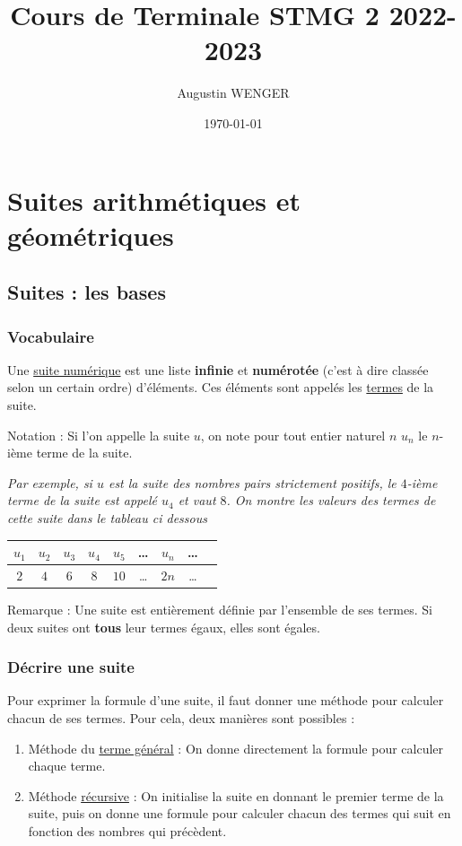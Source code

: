 \documentclass[10pt,a4paper]{book}
\author{Augustin WENGER}
\title{Cours de Terminale STMG 2 2022-2023}
\date{\today}
\begin{document}
\maketitle
\tableofcontents
\chapter{Suites arithmétiques et géométriques}

\section{Suites : les bases}


\subsection{Vocabulaire}

\begin{de}[Rappel]
    Une \underline{suite numérique} est une liste \textbf{infinie} et \textbf{numérotée} (c'est à dire classée selon un certain ordre) d'éléments.
 Ces éléments sont appelés les \underline{termes} de la suite.
\end{de}


Notation : Si l'on appelle la suite $u$, on note pour tout entier naturel $n$   $u_n$ le $n$-ième terme de la suite.


\textit{Par exemple, si $u$ est la suite des nombres pairs strictement positifs, le $4$-ième terme de la suite est appelé $u_4$ et vaut $8$. On montre les valeurs des termes de cette suite dans le tableau ci dessous }

{
\centering
    \begin{tabular}{|c|c|c|c|c|c|c|c|c|}
        \hline
         $u_1$ & $u_2$ & $u_3$ & $u_4$ & $u_5$ & \ldots & $u_n$ & \ldots\\
        \hline
         $2$ & $4$ & $6$ & $8$ & $10$ & \ldots & $2n$ & \ldots \\ 
        \hline
    \end{tabular}\par
}

Remarque : Une suite est entièrement définie par l'ensemble de ses termes. Si deux suites ont \textbf{tous} leur termes égaux, elles sont égales.

\subsection{Décrire une suite}

Pour exprimer la formule d'une suite, il faut donner une méthode pour calculer chacun de ses termes. Pour cela, deux manières sont possibles :
    \begin{enumerate}
      \item Méthode du \underline{terme général} : On donne directement la formule pour calculer chaque terme. 

      \item Méthode \underline{récursive} : On initialise la suite en donnant le premier terme de la suite, puis on donne une formule pour calculer chacun des termes qui suit en fonction des nombres qui précèdent.
    \end{enumerate}
    
\end{document}
